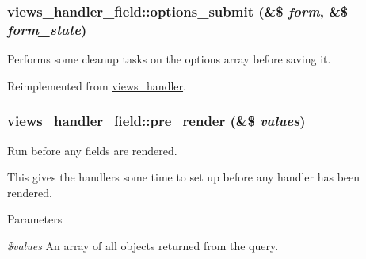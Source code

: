 {\subsubsection[{options\_\-submit}]{\setlength{\rightskip}{0pt plus 5cm}views\_\-handler\_\-field::options\_\-submit (\&\$ {\em form}, \/  \&\$ {\em form\_\-state})}}
\label{classviews__handler__field_a58f6d9eb88577b3aef096386973fc9eb}
Performs some cleanup tasks on the options array before saving it. 

Reimplemented from \hyperlink{classviews__handler_abb55e97dbb1e634b95a1cc9ea836d6e8}{views\_\-handler}.\hypertarget{classviews__handler__field_aff134f525e1f83271183939fda4cd0e8}{
\subsubsection[{pre\_\-render}]{\setlength{\rightskip}{0pt plus 5cm}views\_\-handler\_\-field::pre\_\-render (\&\$ {\em values})}}
\label{classviews__handler__field_aff134f525e1f83271183939fda4cd0e8}
Run before any fields are rendered.

This gives the handlers some time to set up before any handler has been rendered.


\begin{DoxyParams}{Parameters}
\item[{\em \$values}]An array of all objects returned from the query. \end{DoxyParams}


